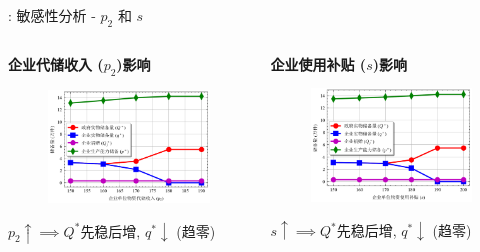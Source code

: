 \documentclass[9pt]{beamer}
\begin{document}
\begin{frame}{\insertsectionhead: 敏感性分析 - $p_2$ 和 $s$}
    \begin{columns}[T]
        \begin{column}{0.5\textwidth}
            \textbf{企业代储收入 ($p_2$)影响}
            \begin{figure}
                \includegraphics[width=\linewidth]{basic_pictures/sensitivity_p2.png}
                \caption*{}
            \end{figure}
            \footnotesize $p_2 \uparrow \implies Q^*$先稳后增, $q^* \downarrow$ (趋零)
        \end{column}
        \begin{column}{0.5\textwidth}
            \textbf{企业使用补贴 ($s$)影响}
            \begin{figure}
                \includegraphics[width=\linewidth]{basic_pictures/sensitivity_s.png}
                \caption*{}
            \end{figure}
            \footnotesize $s \uparrow \implies Q^*$先稳后增, $q^* \downarrow$ (趋零)
        \end{column}
    \end{columns}
\end{frame}
\end{document}
